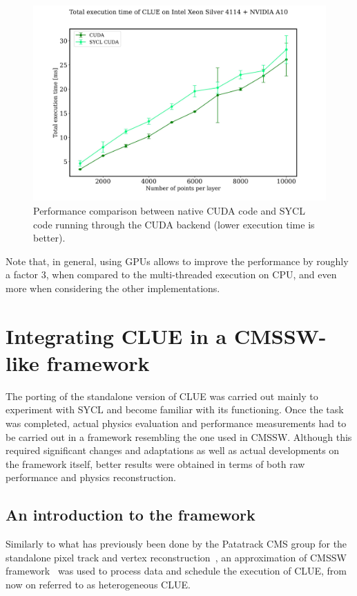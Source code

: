 \begin{figure}[H]
    \centering
    \includegraphics[width=\textwidth]{media/clue_standalone_cuda.jpg}
    \caption{Performance comparison between native CUDA code and SYCL code running through the CUDA backend (lower execution time is better).}
    \label{fig:clue_standalone_cuda}
\end{figure}

Note that, in general, using GPUs allows to improve the performance by roughly a factor 3, when compared to the multi-threaded execution on CPU, and even more when considering the other implementations.

\section{Integrating CLUE in a CMSSW-like framework}
The porting of the standalone version of CLUE was carried out mainly to experiment with SYCL and become familiar with its functioning. Once the task was completed, actual physics evaluation and performance measurements had to be carried out in a framework resembling the one used in CMSSW. Although this required significant changes and adaptations as well as actual developments on the framework itself,  better results were obtained in terms of both raw performance and physics reconstruction.

\subsection{An introduction to the framework}
Similarly to what has previously been done by the Patatrack CMS group for the standalone pixel track and vertex reconstruction~\cite{pixeltrack}, an approximation of CMSSW framework~\cite{cmssw} was used to process data and schedule the execution of CLUE, from now on referred to as heterogeneous CLUE. 

